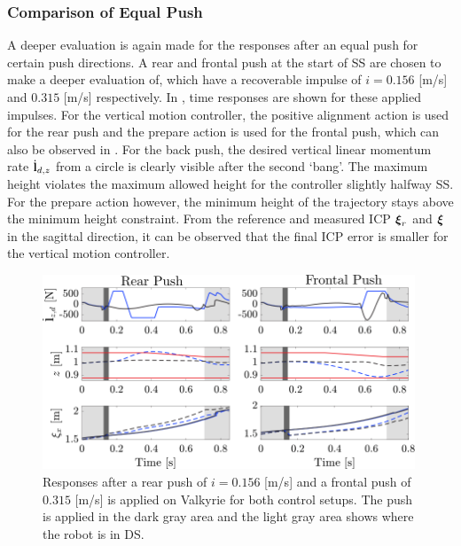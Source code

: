 \subsubsection{Comparison of Equal Push} 
A deeper evaluation is again made for the responses after an equal push for certain push directions. A rear and frontal push at the start of \ac{SS} are chosen to make a deeper evaluation of, which have a recoverable impulse of $i=0.156$ [m/s] and $0.315$ [m/s] respectively. In , time responses are shown for these applied impulses. For the vertical motion controller, the positive alignment action is used for the rear push and the prepare action is used for the frontal push, which can also be observed in . For the back push, the desired vertical linear momentum rate $\dot{\mathbf{l}}_{d,z}$ from a circle is clearly visible after the second `bang'. The maximum height violates the maximum allowed height for the controller slightly halfway \ac{SS}. For the prepare action however, the minimum height of the trajectory stays above the minimum height constraint. From the reference and measured \ac{ICP} $\boldsymbol{\xi}_r$ and $\boldsymbol{\xi}$ in the sagittal direction, it can be observed that the final \ac{ICP} error is smaller for the vertical motion controller.
\begin{figure}
     \centering
        \includegraphics[width=0.99\textwidth]{STYLESTUFF/walkplot.png}
    \caption{Responses after a rear push of $i=0.156$ [m/s] and a frontal push of $0.315$ [m/s] is applied on Valkyrie for both control setups. The push is applied in the dark gray area and the light gray area shows where the robot is in \ac{DS}.}
    \label{fig:walkplot}
\end{figure}

